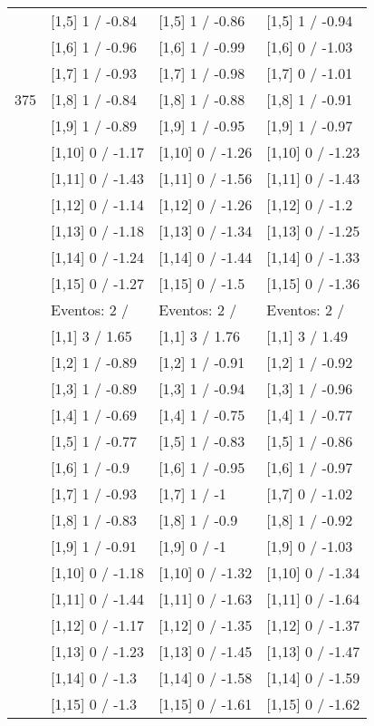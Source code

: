 \begin{table}
\begin{tabular}[t]{llll}
 & {}[1,5] 1  / -0.84 & {}[1,5] 1  / -0.86 & {}[1,5] 1  / -0.94\\
 & {}[1,6] 1  / -0.96 & {}[1,6] 1  / -0.99 & {}[1,6] 0  / -1.03\\
 & {}[1,7] 1  / -0.93 & {}[1,7] 1  / -0.98 & {}[1,7] 0  / -1.01\\
375 & {}[1,8] 1  / -0.84 & {}[1,8] 1  / -0.88 & {}[1,8] 1  / -0.91\\
\addlinespace
 & {}[1,9] 1  / -0.89 & {}[1,9] 1  / -0.95 & {}[1,9] 1  / -0.97\\
 & {}[1,10] 0  / -1.17 & {}[1,10] 0  / -1.26 & {}[1,10] 0  / -1.23\\
 & {}[1,11] 0  / -1.43 & {}[1,11] 0  / -1.56 & {}[1,11] 0  / -1.43\\
 & {}[1,12] 0  / -1.14 & {}[1,12] 0  / -1.26 & {}[1,12] 0  / -1.2\\
 & {}[1,13] 0  / -1.18 & {}[1,13] 0  / -1.34 & {}[1,13] 0  / -1.25\\
\addlinespace
 & {}[1,14] 0  / -1.24 & {}[1,14] 0  / -1.44 & {}[1,14] 0  / -1.33\\
 & {}[1,15] 0  / -1.27 & {}[1,15] 0  / -1.5 & {}[1,15] 0  / -1.36\\
 & Eventos:  2 / & Eventos:  2 / & Eventos:  2 /\\
 & {}[1,1] 3  / 1.65 & {}[1,1] 3  / 1.76 & {}[1,1] 3  / 1.49\\
 & {}[1,2] 1  / -0.89 & {}[1,2] 1  / -0.91 & {}[1,2] 1  / -0.92\\
\addlinespace
 & {}[1,3] 1  / -0.89 & {}[1,3] 1  / -0.94 & {}[1,3] 1  / -0.96\\
 & {}[1,4] 1  / -0.69 & {}[1,4] 1  / -0.75 & {}[1,4] 1  / -0.77\\
 & {}[1,5] 1  / -0.77 & {}[1,5] 1  / -0.83 & {}[1,5] 1  / -0.86\\
 & {}[1,6] 1  / -0.9 & {}[1,6] 1  / -0.95 & {}[1,6] 1  / -0.97\\
 & {}[1,7] 1  / -0.93 & {}[1,7] 1  / -1 & {}[1,7] 0  / -1.02\\
\addlinespace
500 & {}[1,8] 1  / -0.83 & {}[1,8] 1  / -0.9 & {}[1,8] 1  / -0.92\\
 & {}[1,9] 1  / -0.91 & {}[1,9] 0  / -1 & {}[1,9] 0  / -1.03\\
 & {}[1,10] 0  / -1.18 & {}[1,10] 0  / -1.32 & {}[1,10] 0  / -1.34\\
 & {}[1,11] 0  / -1.44 & {}[1,11] 0  / -1.63 & {}[1,11] 0  / -1.64\\
 & {}[1,12] 0  / -1.17 & {}[1,12] 0  / -1.35 & {}[1,12] 0  / -1.37\\
\addlinespace
 & {}[1,13] 0  / -1.23 & {}[1,13] 0  / -1.45 & {}[1,13] 0  / -1.47\\
 & {}[1,14] 0  / -1.3 & {}[1,14] 0  / -1.58 & {}[1,14] 0  / -1.59\\
 & {}[1,15] 0  / -1.3 & {}[1,15] 0  / -1.61 & {}[1,15] 0  / -1.62\\
\bottomrule
\end{tabular}
\end{table}
